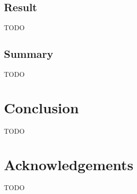 \documentclass[9pt,conference]{IEEEtran}
\begin{document}
    \subsection{Result}
    \label{section:case_result}

    TODO

    \subsection{Summary}
    \label{section:case_summary}

    TODO

    \section{Conclusion}
    \label{section:conclusion}
    TODO

    \section*{Acknowledgements}
    TODO

    
    
\end{document}
